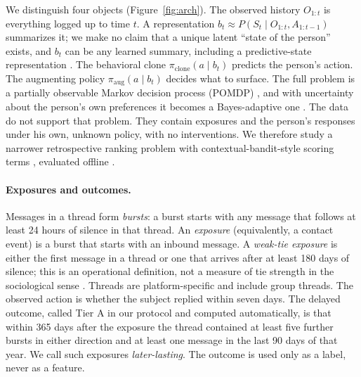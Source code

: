 \documentclass[11pt]{article}
\begin{document}
We distinguish four objects (Figure~\ref{fig:arch}). The observed history $O_{1:t}$ is everything logged up to time $t$. A representation $b_t \approx P(S_t \mid O_{1:t}, A_{1:t-1})$ summarizes it; we make no claim that a unique latent ``state of the person'' exists, and $b_t$ can be any learned summary, including a predictive-state representation \citep{littman2002predictive,singh2004predictive}. The behavioral clone $\pi_{\mathrm{clone}}(a \mid b_t)$ predicts the person's action. The augmenting policy $\pi_{\mathrm{aug}}(a \mid b_t)$ decides what to surface. The full problem is a partially observable Markov decision process (POMDP) \citep{kaelbling1998planning}, and with uncertainty about the person's own preferences it becomes a Bayes-adaptive one \citep{duff2002optimal,guez2012efficient}. The data do not support that problem. They contain exposures and the person's responses under his own, unknown policy, with no interventions. We therefore study a narrower retrospective ranking problem with contextual-bandit-style scoring terms \citep{li2010contextual}, evaluated offline \citep{li2011unbiased,swaminathan2015counterfactual}.

\paragraph{Exposures and outcomes.} Messages in a thread form \emph{bursts}: a burst starts with any message that follows at least 24 hours of silence in that thread. An \emph{exposure} (equivalently, a contact event) is a burst that starts with an inbound message. A \emph{weak-tie exposure} is either the first message in a thread or one that arrives after at least 180 days of silence; this is an operational definition, not a measure of tie strength in the sociological sense \citep{granovetter1973strength}. Threads are platform-specific and include group threads. The observed action is whether the subject replied within seven days. The delayed outcome, called Tier A in our protocol and computed automatically, is that within 365 days after the exposure the thread contained at least five further bursts in either direction and at least one message in the last 90 days of that year. We call such exposures \emph{later-lasting}. The outcome is used only as a label, never as a feature.
\end{document}
